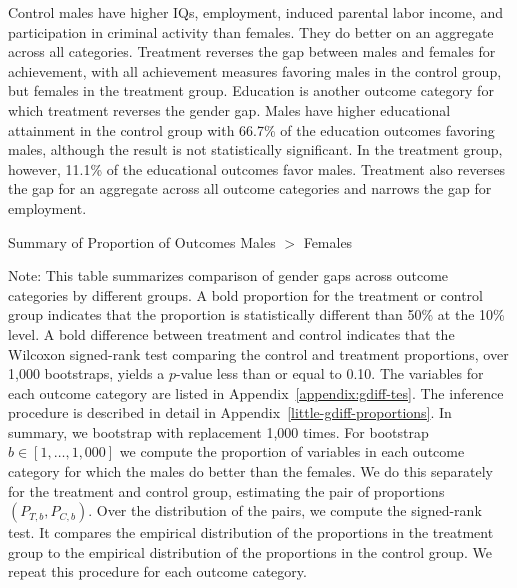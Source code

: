 Control males have higher IQs, employment, induced parental labor income, and participation in criminal activity than females. They do better on an aggregate across all categories. Treatment reverses the gap between males and females for achievement, with all achievement measures favoring males in the control group, but females in the treatment group. Education is another outcome category for which treatment reverses the gender gap. Males have higher educational attainment in the control group with 66.7\% of the education outcomes favoring males, although the result is not statistically significant. In the treatment group, however, 11.1\% of the educational outcomes favor males. Treatment also reverses the gap for an aggregate across all outcome categories and narrows the gap for employment.

\begin{table}[H]
\centering
\caption{Summary of Proportion of Outcomes Males $>$ Females}
\label{tab:proportion-table-ranksign}
\begin{threeparttable}

\begin{tablenotes}
\footnotesize
\item Note: This table summarizes comparison of gender gaps across outcome categories by different groups. A bold proportion for the treatment or control group indicates that the proportion is statistically different than 50\% at the 10\% level. A bold difference between treatment and control indicates that the Wilcoxon signed-rank test comparing the control and treatment proportions, over 1,000 bootstraps, yields a $p$-value less than or equal to 0.10. The variables for each outcome category are listed in Appendix~\ref{appendix:gdiff-tes}. The inference procedure is described in detail in Appendix~\ref{little-gdiff-proportions}. In summary, we bootstrap with replacement 1,000 times. For bootstrap $b \in [1, \ldots, 1,000]$ we compute the proportion of variables in each outcome category for which the males do better than the females. We do this separately for the treatment and control group, estimating the pair of proportions $(P_{T,b}, P_{C,b})$. Over the distribution of the pairs, we compute the signed-rank test. It compares the empirical distribution of the proportions in the treatment group to the empirical distribution of the proportions in the control group. We repeat this procedure for each outcome category.
\end{tablenotes}
\end{threeparttable}
\end{table}

